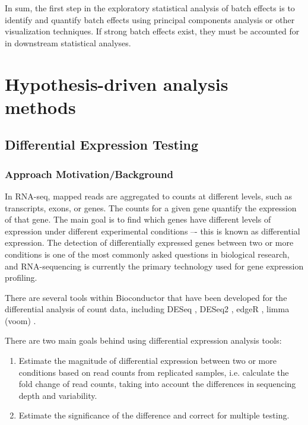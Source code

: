 In sum, the first step in the exploratory statistical analysis of batch effects is to identify and quantify batch effects using principal components analysis or other visualization techniques. If strong batch effects exist, they must be accounted for in downstream statistical analyses. 

 

\newpage
\section{Hypothesis-driven analysis methods}    




    \subsection{Differential Expression Testing}
    \subsubsection{Approach Motivation/Background}
    In RNA-seq, mapped reads are aggregated to counts at different levels, such as transcripts, exons, or genes. The counts for a given gene quantify the expression of that gene. The main goal is to find which genes have different levels of expression under different experimental conditions –- this is known as differential expression.
    The detection of differentially expressed genes between two or more conditions is one of the most commonly asked questions in biological research, and RNA-sequencing is currently the primary technology used for gene expression profiling.

    There are several tools within Bioconductor that have been developed for the differential analysis of count data, including DESeq \cite{anders2010differential}, DESeq2 \cite{love2014moderated}, edgeR \cite{Robinson2010EdgeR:Data}, limma (voom) \cite{Ritchie2015LimmaStudies}.

    There are two main goals behind using differential expression analysis tools:
    \begin{enumerate}
    \item Estimate the magnitude of differential expression between two or more conditions based on read counts from replicated samples, i.e. calculate the fold change of read counts, taking into account the differences in sequencing depth and variability.
    \item Estimate the significance of the difference and correct for multiple testing.
    \end{enumerate}

